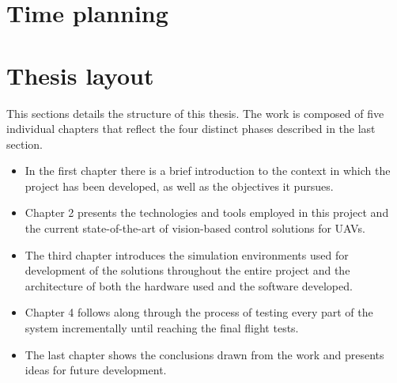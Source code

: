 \section{Time planning}
\label{sec:time-planning}



\section{Thesis layout}
\label{sec:layout}

This sections details the structure of this thesis.
The work is composed of five individual chapters that reflect the four distinct phases described in the last section.

\begin{itemize}
    \item In the first chapter there is a brief introduction to the context in which the project has been developed, as well as the objectives it pursues.
    \item Chapter 2 presents the technologies and tools employed in this project and the current state-of-the-art of vision-based control solutions for UAVs.
    \item The third chapter introduces the simulation environments used for development of the solutions throughout the entire project and the architecture of both the hardware used and the software developed.
    \item Chapter 4 follows along through the process of testing every part of the system incrementally until reaching the final flight tests.
    \item The last chapter shows the conclusions drawn from the work and presents ideas for future development.
\end{itemize}


\cleardoublepage